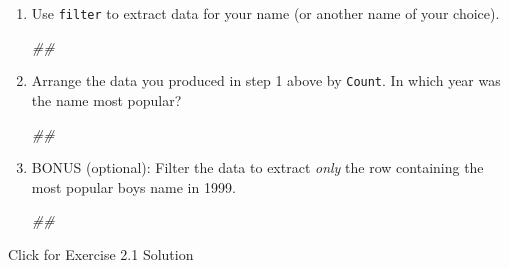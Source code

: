 \documentclass[
]{book}
\newenvironment{Shaded}{\begin{snugshade}}{\end{snugshade}}
\newcommand{\CommentTok}[1]{\textcolor[rgb]{0.56,0.35,0.01}{\textit{#1}}}
\begin{document}
\begin{enumerate}
\def\labelenumi{\arabic{enumi}.}
\item
  Use \texttt{filter} to extract data for your name (or another name of your choice).

\begin{Shaded}
\begin{Highlighting}[]
\CommentTok{\#\#}
\end{Highlighting}
\end{Shaded}
\item
  Arrange the data you produced in step 1 above by \texttt{Count}. In which year was the name most popular?

\begin{Shaded}
\begin{Highlighting}[]
\CommentTok{\#\#}
\end{Highlighting}
\end{Shaded}
\item
  BONUS (optional): Filter the data to extract \emph{only} the row containing the most popular boys name in 1999.

\begin{Shaded}
\begin{Highlighting}[]
\CommentTok{\#\#}
\end{Highlighting}
\end{Shaded}
\end{enumerate}

{Click for Exercise 2.1 Solution}
\end{document}
